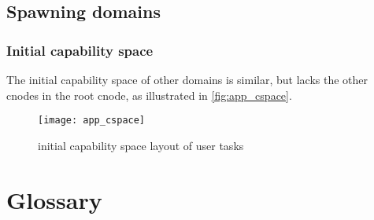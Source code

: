 \documentclass[a4paper,11pt,twoside]{report}
\begin{document}
\section{Spawning domains}
\subsection{Initial capability space}

The initial capability space of other domains is similar, but lacks the other
cnodes in the root cnode, as illustrated in \autoref{fig:app_cspace}.

\begin{figure}
\centering
\texttt{[image: app\_cspace]}
\caption{initial capability space layout of user tasks}
\label{fig:app_cspace}
\end{figure}


\appendix
\chapter{Glossary}
\end{document}
